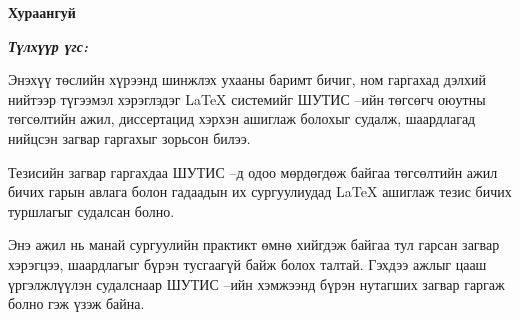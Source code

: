 

\begin{center}
{\scshape\Large \univname\par} %
{\scshape\large \facname\par}\vspace{0.5cm} %
{\huge\textbf{{Хураангуй}} \par}
\bigskip
{\Large{\ttitle} \par} %
\bigskip

{\normalsize \shortname \par} %
\addressname
\end{center}

\textit{\textbf{Түлхүүр үгс: \keywordnames}}
\bigskip

Энэхүү төслийн хүрээнд шинжлэх ухааны баримт бичиг, ном гаргахад дэлхий нийтээр түгээмэл хэрэглэдэг \LaTeX{} системийг ШУТИС --ийн төгсөгч оюутны төгсөлтийн ажил, диссертацид хэрхэн ашиглаж болохыг судалж, шаардлагад нийцсэн загвар гаргахыг зорьсон билээ. 

Тезисийн загвар гаргахдаа ШУТИС --д одоо мөрдөгдөж байгаа төгсөлтийн ажил бичих гарын авлага болон гадаадын их сургуулиудад \LaTeX{} ашиглаж тезис бичих туршлагыг судалсан болно.

Энэ ажил нь манай сургуулийн практикт өмнө хийгдэж байгаа тул гарсан загвар хэрэгцээ, шаардлагыг бүрэн тусгаагүй байж болох талтай. Гэхдээ ажлыг цааш үргэлжлүүлэн судалснаар ШУТИС --ийн хэмжээнд бүрэн нутагших загвар гаргаж болно гэж үзэж байна.



